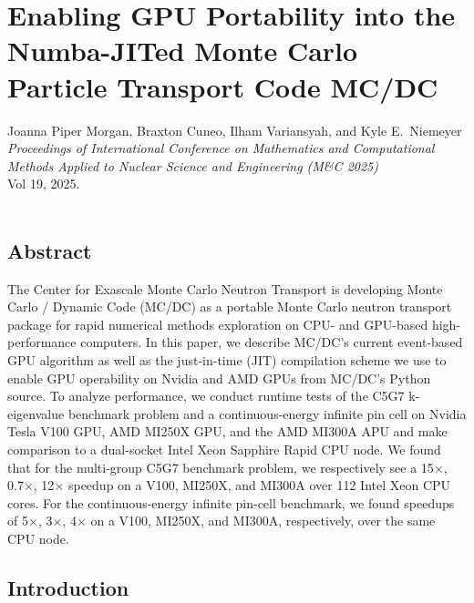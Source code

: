 \renewcommand{\TheTitle}{Enabling GPU Portability into the Numba-JITed Monte Carlo Particle Transport Code MC/DC}

\renewcommand{\TheAuthors}{%
  Joanna Piper Morgan,
  Braxton Cuneo,
  Ilham Variansyah, 
  and Kyle E.~Niemeyer%
  }
  
\renewcommand{\TheAddress}{%
    \textit{Proceedings of International Conference on Mathematics and Computational Methods Applied to Nuclear Science and Engineering (M\&C 2025)}\\
    Vol 19, 2025.\\
    \doi{10.13182/MC25-47142}\\
    \arxiv{2501.05440}
}

\chapter{\TheTitle}
\label{chapter:mcdc_prof}

\vspace{1em}
\TheAuthors\\
\TheAddress



\section*{Abstract}%
The Center for Exascale Monte Carlo Neutron Transport is developing Monte Carlo / Dynamic Code (MC/DC) as a portable Monte Carlo neutron transport package for rapid numerical methods exploration on CPU- and GPU-based high-performance computers.
In this paper, we describe MC/DC's current event-based GPU algorithm as well as the just-in-time (JIT) compilation scheme we use to enable GPU operability on Nvidia and AMD GPUs from MC/DC's Python source.
To analyze performance, we conduct runtime tests of the C5G7 k-eigenvalue benchmark problem and a continuous-energy infinite pin cell on Nvidia Tesla V100 GPU, AMD MI250X GPU, and the AMD MI300A APU and make comparison to a dual-socket Intel Xeon Sapphire Rapid CPU node.
We found that for the multi-group C5G7 benchmark problem, we respectively see a 15$\times$, 0.7$\times$, 12$\times$ speedup on a V100, MI250X, and MI300A over 112 Intel Xeon CPU cores.
For the continuous-energy infinite pin-cell benchmark, we found speedups of 5$\times$, 3$\times$, 4$\times$ on a V100, MI250X, and MI300A, respectively, over the same CPU node.


\section{Introduction}\label{sec:1}

